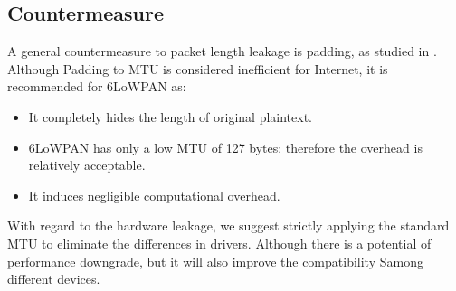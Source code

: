 \subsection{Countermeasure}
%
A general countermeasure to packet length leakage is padding, as studied in \cite{Peekaboo}. Although Padding to MTU is considered inefficient for Internet, it is recommended for 6LoWPAN as:
\begin{itemize}
	\item It completely hides the length of original plaintext.
	\item 6LoWPAN has only a low MTU of 127 bytes; therefore the overhead is relatively acceptable.
	\item It induces negligible computational overhead.
\end{itemize}


With regard to the hardware leakage, we suggest strictly applying the standard MTU to eliminate the differences in drivers. Although there is a potential of performance downgrade, but it will also improve the compatibility Samong different devices.
